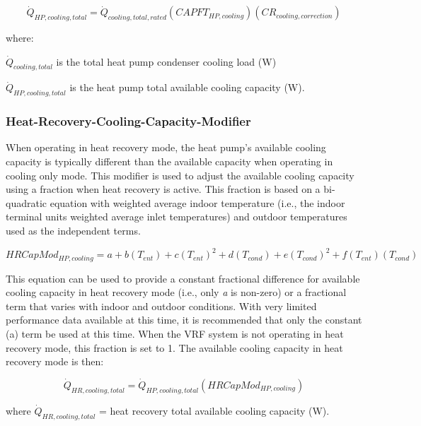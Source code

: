 \begin{equation}
  \dot{Q}_{HP,cooling,total} = \dot{Q}_{cooling,total,rated} \left( CAPFT_{HP,cooling} \right) \left( CR_{cooling,correction} \right)
\end{equation}

where:

\(\dot{Q}_{cooling,total}\) is the total heat pump condenser cooling load (W)

\(\dot{Q}_{HP,cooling,total}\) is the heat pump total available cooling capacity (W).

\subsubsection{Heat-Recovery-Cooling-Capacity-Modifier}\label{heat-recovery-cooling-capacity-modifier}

When operating in heat recovery mode, the heat pump's available cooling capacity is typically different than the available capacity when operating in cooling only mode. This modifier is used to adjust the available cooling capacity using a fraction when heat recovery is active. This fraction is based on a bi-quadratic equation with weighted average indoor temperature (i.e., the indoor terminal units weighted average inlet temperatures) and outdoor temperatures used as the independent terms.

\begin{equation}
  HRCapMod_{HP,cooling} = a + b \left( T_{ent} \right) + c \left( T_{ent} \right)^2 + d \left( T_{cond} \right) + e \left( T_{cond} \right)^2 + f \left( T_{ent} \right) \left( T_{cond} \right)
\end{equation}

This equation can be used to provide a constant fractional difference for available cooling capacity in heat recovery mode (i.e., only \emph{a} is non-zero) or a fractional term that varies with indoor and outdoor conditions. With very limited performance data available at this time, it is recommended that only the constant (a) term be used at this time. When the VRF system is not operating in heat recovery mode, this fraction is set to 1. The available cooling capacity in heat recovery mode is then:

\begin{equation}
  \dot{Q}_{HR,cooling,total} = \dot{Q}_{HP,cooling,total} \left( HRCapMod_{HP,cooling} \right)
\end{equation}

where \(\dot{Q}_{HR,cooling,total}\) = heat recovery total available cooling capacity (W).


